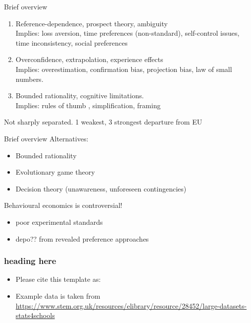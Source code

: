 \documentclass[11pt, aspectratio=169]{beamer}
\begin{document}
\begin{frame}{Brief overview}
    \begin{enumerate}[1:]
        \item Reference-dependence, prospect theory, ambiguity\\
        Implies: loss aversion, time preferences (non-standard), self-control issues, time inconsistency, social preferences\\
        \item Overconfidence, extrapolation, experience effects\\
        Implies: overestimation, confirmation bias, projection bias, law of small numbers.\\
        \item Bounded rationality, cognitive limitations.\\
        Implies: rules of thumb , simplification, framing
    \end{enumerate}

    Not sharply separated.  1 weakest, 3 strongest departure  from EU
\end{frame}

\begin{frame}{Brief overview}
Alternatives:
    \begin{itemize}
        \item Bounded rationality
        \item Evolutionary game theory
        \item Decision theory (unawareness, unforeseen contingencies)
    \end{itemize}
Behavioural economics is controversial!
    \begin{itemize}
        \item poor experimental standards
        \item depo?? from revealed preference approaches
    \end{itemize}
\end{frame}


\begin{frame}[t]
    \frametitle{heading here}
    \begin{itemize}
        \item<+-> Please cite this template as: \citet{GaudeckerEconProjectTemplates}
        \item<+-> Example data is taken from \url{https://www.stem.org.uk/resources/elibrary/resource/28452/large-datasets-stats4schools}
    \end{itemize}
    \note{~}
\end{frame}
\end{document}
